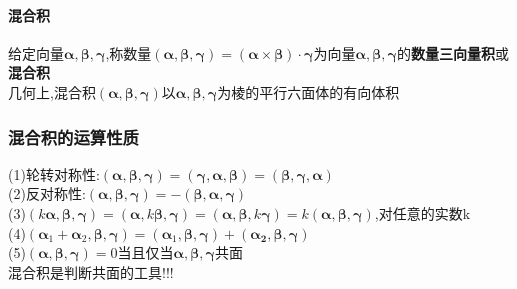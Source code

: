 \documentclass{article}
\newcommand{\ve}{\boldsymbol}
\begin{document}
\begin{CJK}{UTF8}{gkai}
\paragraph{混合积\\}
给定向量$\ve{\alpha},\ve{\beta},\ve{\gamma}$,称数量$(\ve{\alpha},\ve{\beta},\ve{\gamma})=(\ve{\alpha}\times\ve{\beta})\cdot\ve{\gamma}$为向量$\ve{\alpha},\ve{\beta},\ve{\gamma}$的\textbf{数量三向量积}或\textbf{混合积}\\
几何上,混合积$(\ve{\alpha},\ve{\beta},\ve{\gamma})$以$\ve{\alpha},\ve{\beta},\ve{\gamma}$为棱的平行六面体的有向体积\\
\subsubsection*{混合积的运算性质}
(1)轮转对称性:$(\ve{\alpha},\ve{\beta},\ve{\gamma})=(\ve{\gamma},\ve{\alpha},\ve{\beta})=(\ve{\beta},\ve{\gamma},\ve{\alpha})$\\
(2)反对称性:$(\ve{\alpha},\ve{\beta},\ve{\gamma})=-(\ve{\beta},\ve{\alpha},\ve{\gamma})$\\
(3)$(k\ve{\alpha},\ve{\beta},\ve{\gamma})=(\ve{\alpha},k\ve{\beta},\ve{\gamma})=(\ve{\alpha},\ve{\beta},k\ve{\gamma})=k(\ve{\alpha},\ve{\beta},\ve{\gamma})$,对任意的实数k\\
(4)$(\ve{\alpha}_1+\ve{\alpha}_2,\ve{\beta},\ve{\gamma})=(\ve{\alpha}_1,\ve{\beta},\ve{\gamma})+(\ve{\alpha_2},\ve{\beta},\ve{\gamma})$\\
(5)$(\ve{\alpha},\ve{\beta},\ve{\gamma})=0$当且仅当$\ve{\alpha},\ve{\beta},\ve{\gamma}$共面\\
混合积是判断共面的工具!!!\\






\end{CJK}
\end{document}
